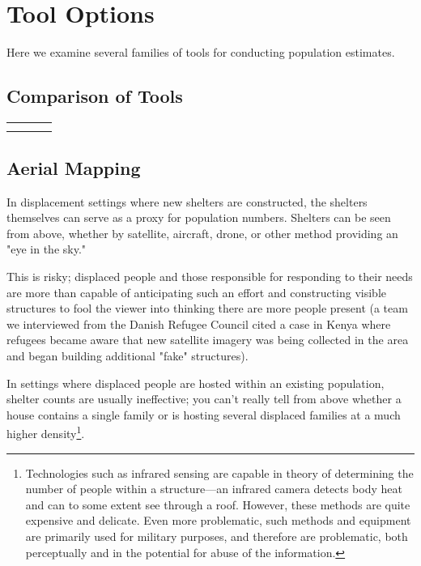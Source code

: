 \documentclass[a4paper,12pt,twoside]{article}
\begin{document}
\section{Tool Options}
Here we examine several families of tools for conducting population estimates. 

\subsection{Comparison of Tools}

\begin{center}
\begin{tabular}{|c|c|c|c|}
\hline
     &  \\
     & 
\end{tabular}    
\end{center}


\subsection{Aerial Mapping}
In displacement settings where new shelters are constructed, the shelters themselves can serve as a proxy for population numbers. Shelters can be seen from above, whether by satellite, aircraft, drone, or other method providing an "eye in the sky." 

This is risky; displaced people and those responsible for responding to their needs are more than capable of anticipating such an effort and constructing visible structures to fool the viewer into thinking there are more people present (a team we interviewed from the Danish Refugee Council cited a case in Kenya where refugees became aware that new satellite imagery was being collected in the area and began building additional "fake" structures).

In settings where displaced people are hosted within an existing population, shelter counts are usually ineffective; you can't really tell from above whether a house contains a single family or is hosting several displaced families at a much higher density\footnote{Technologies such as infrared sensing are capable in theory of determining the number of people within a structure---an infrared camera detects body heat and can to some extent see through a roof. However, these methods are quite expensive and delicate. Even more problematic, such methods and equipment are primarily used for military purposes, and therefore are problematic, both perceptually and in the potential for abuse of the information.}. 
\end{document}
